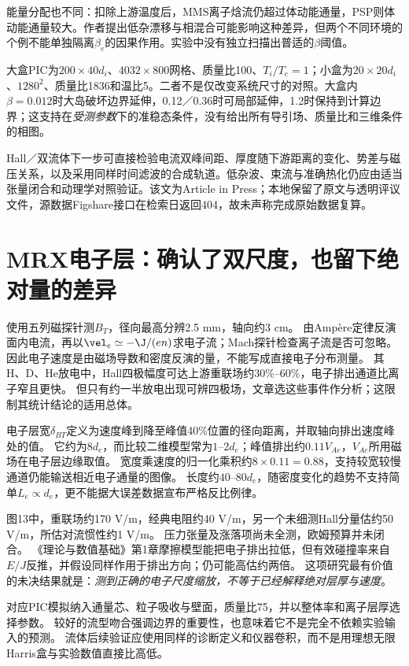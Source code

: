 \documentclass[UTF8,a4paper,11pt,openany,fontset=fandol]{ctexbook}
\begin{document}
能量分配也不同：扣除上游温度后，MMS离子焓流仍超过体动能通量，PSP则体动能通量较大。作者提出低杂漂移与相混合可能影响这种差异，但两个不同环境的个例不能单独隔离$\beta_e$的因果作用。实验中没有独立扫描出普适的$\beta$阈值。

大盒PIC为$200\times40d_i$、$4032\times800$网格、质量比100、$T_i/T_e=1$；小盒为$20\times20d_i$、$1280^2$、质量比1836和温比5。二者不是仅改变系统尺寸的对照。大盒内$\beta=0.012$时大岛破坏边界延伸，0.12／0.36时可局部延伸，1.2时保持到计算边界；这支持在\emph{受测参数}下的准稳态条件，没有给出所有导引场、质量比和三维条件的相图。

Hall／双流体下一步可直接检验电流双峰间距、厚度随下游距离的变化、势差与磁压关系，以及采用同样时间滤波的合成轨道。低杂波、束流与准确热化仍应由适当张量闭合和动理学对照验证。该文为Article in Press；本地保留了原文与透明评议文件，源数据Figshare接口在检索日返回404，故未声称完成原始数据复算。


\section{MRX电子层：确认了双尺度，也留下绝对量的差异}
\citet{L119}使用五列磁探针测$B_T$，径向最高分辨2.5 mm，轴向约3 cm。
由Ampère定律反演面内电流，再以$\vel_e\simeq-\J/(en)$求电子流；Mach探针检查离子流是否可忽略。
因此电子速度是由磁场导数和密度反演的量，不能写成直接电子分布测量。
其H、D、He放电中，Hall四极幅度可达上游重联场约30\%--60\%，电子排出通道比离子窄且更快。
但只有约一半放电出现可辨四极场，文章选这些事件作分析；这限制其统计结论的适用总体。

电子层宽$\delta_{BT}$定义为速度峰到降至峰值40\%位置的径向距离，并取轴向排出速度峰处的值。
它约为$8d_e$，而比较二维模型常为$1$--$2d_e$；峰值排出约$0.11V_{\!Ae}$，$V_{\!Ae}$所用磁场在电子层边缘取值。
宽度乘速度的归一化乘积约$8\times0.11=0.88$，支持较宽较慢通道仍能输送相近电子通量的图像。
长度约$40$--$80d_e$，随密度变化的趋势不支持简单$L_e\propto d_e$，更不能据大误差数据宣布严格反比例律。

图13中，重联场约170 V/m，经典电阻约40 V/m，另一个未细测Hall分量估约50 V/m，所估对流惯性约1 V/m。
压力张量及涨落项尚未全测，欧姆预算并未闭合。
《理论与数值基础》第1章摩擦模型能把电子排出拉低，但有效碰撞率来自$E/J$反推，并假设同样作用于排出方向；仍可能高估约两倍。
这项研究最有价值的未决结果就是：\emph{测到正确的电子尺度缩放，不等于已经解释绝对层厚与速度}。

对应PIC模拟纳入通量芯、粒子吸收与壁面，质量比75，并以整体率和离子层厚选择参数。
较好的流型吻合强调边界的重要性，也意味着它不是完全不依赖实验输入的预测。
流体后续验证应使用同样的诊断定义和仪器卷积，而不是用理想无限Harris盒与实验数值直接比高低。
\end{document}
